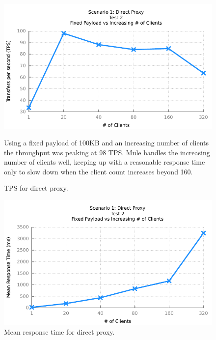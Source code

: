 \begin{figure}[H]
	\caption{TPS for direct proxy.}
	\centerline{\includegraphics{img/proxy_fp_iu_tps}}
	\label{fig:proxy-2-1}
	Using a fixed payload of 100KB and an increasing number of clients the throughput was peaking at 98 TPS. Mule handles the increasing number of clients well, keeping up with a reasonable response time only to slow down when the client count increases beyond 160.
\end{figure}

\begin{figure}[H]
	\caption{Mean response time for direct proxy.}
	\centerline{\includegraphics{img/proxy_fp_iu_resp}}
	\label{fig:proxy-2-2}
\end{figure}


